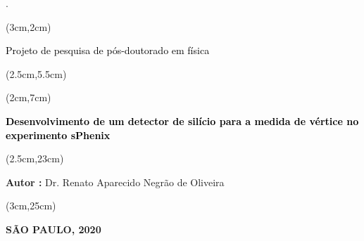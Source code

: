 \begin{titlepage}.
    

    \vspace{3.5cm}

    
    \begin{textblock*}{15cm}(3cm,2cm)
        \begin{Huge}
            \begin{center}
                \makeatletter
                \noindent\textcolor{black}{ Projeto de pesquisa de pós-doutorado em física}
                \makeatother
            \end{center}
        \end{Huge}
    \end{textblock*}
    
    \begin{textblock*}{15cm}(2.5cm,5.5cm)
        \makeatletter
        \begin{LARGE}
            \begin{center}
                \color{black}
                {\it  }
            \end{center}
         \end{LARGE}
     
    \end{textblock*}
    
    \begin{textblock*}{17.5cm}(2cm,7cm)
        \begin{Huge}
            \begin{center}
                \makeatletter
                \noindent\textcolor{black}{\textbf{Desenvolvimento de um detector de silício para a medida de vértice no experimento sPhenix}}
                \makeatother
            \end{center}
        \end{Huge}
    \end{textblock*}

    \begin{textblock*}{15cm}(2.5cm,23cm)
        \begin{LARGE}
        \begin{center}
            \color{darkgray}
                \textbf{Autor :} Dr. Renato Aparecido Negrão de Oliveira 
        \end{center}
            
        \end{LARGE}
        
    \end{textblock*}
    
    \begin{textblock*}{15cm}(3cm,25cm)
        \makeatletter
        \begin{center}
            {\color{white}
                \textbf{SÃO PAULO, 2020} 
            }
        \end{center}
        \makeatother
    \end{textblock*}

\end{titlepage}
